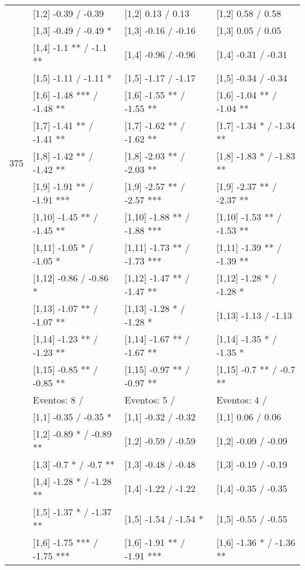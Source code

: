 \begin{table}
\begin{tabular}[t]{llll}
 & {}[1,2] -0.39  / -0.39 & {}[1,2] 0.13  / 0.13 & {}[1,2] 0.58  / 0.58\\
 & {}[1,3] -0.49  / -0.49 * & {}[1,3] -0.16  / -0.16 & {}[1,3] 0.05  / 0.05\\
\addlinespace
 & {}[1,4] -1.1 ** / -1.1 ** & {}[1,4] -0.96  / -0.96 & {}[1,4] -0.31  / -0.31\\
 & {}[1,5] -1.11  / -1.11 * & {}[1,5] -1.17  / -1.17 & {}[1,5] -0.34  / -0.34\\
 & {}[1,6] -1.48 *** / -1.48 ** & {}[1,6] -1.55 ** / -1.55 ** & {}[1,6] -1.04 ** / -1.04 **\\
 & {}[1,7] -1.41 ** / -1.41 ** & {}[1,7] -1.62 ** / -1.62 ** & {}[1,7] -1.34 * / -1.34 **\\
375 & {}[1,8] -1.42 ** / -1.42 ** & {}[1,8] -2.03 ** / -2.03 ** & {}[1,8] -1.83 * / -1.83 **\\
\addlinespace
 & {}[1,9] -1.91 ** / -1.91 *** & {}[1,9] -2.57 ** / -2.57 *** & {}[1,9] -2.37 ** / -2.37 **\\
 & {}[1,10] -1.45 ** / -1.45 ** & {}[1,10] -1.88 ** / -1.88 *** & {}[1,10] -1.53 ** / -1.53 **\\
 & {}[1,11] -1.05 * / -1.05 * & {}[1,11] -1.73 ** / -1.73 *** & {}[1,11] -1.39 ** / -1.39 **\\
 & {}[1,12] -0.86  / -0.86 * & {}[1,12] -1.47 ** / -1.47 ** & {}[1,12] -1.28 * / -1.28 *\\
 & {}[1,13] -1.07 ** / -1.07 ** & {}[1,13] -1.28 * / -1.28 * & {}[1,13] -1.13  / -1.13\\
\addlinespace
 & {}[1,14] -1.23 ** / -1.23 ** & {}[1,14] -1.67 ** / -1.67 ** & {}[1,14] -1.35 * / -1.35 *\\
 & {}[1,15] -0.85 ** / -0.85 ** & {}[1,15] -0.97 ** / -0.97 ** & {}[1,15] -0.7 ** / -0.7 **\\
 & Eventos:  8 / & Eventos:  5 / & Eventos:  4 /\\
 & {}[1,1] -0.35  / -0.35 * & {}[1,1] -0.32  / -0.32 & {}[1,1] 0.06  / 0.06\\
 & {}[1,2] -0.89 * / -0.89 ** & {}[1,2] -0.59  / -0.59 & {}[1,2] -0.09  / -0.09\\
\addlinespace
 & {}[1,3] -0.7 * / -0.7 ** & {}[1,3] -0.48  / -0.48 & {}[1,3] -0.19  / -0.19\\
 & {}[1,4] -1.28 * / -1.28 ** & {}[1,4] -1.22  / -1.22 & {}[1,4] -0.35  / -0.35\\
 & {}[1,5] -1.37 * / -1.37 ** & {}[1,5] -1.54  / -1.54 * & {}[1,5] -0.55  / -0.55\\
 & {}[1,6] -1.75 *** / -1.75 *** & {}[1,6] -1.91 ** / -1.91 *** & {}[1,6] -1.36 * / -1.36 **\\

\end{tabular}
\end{table}
